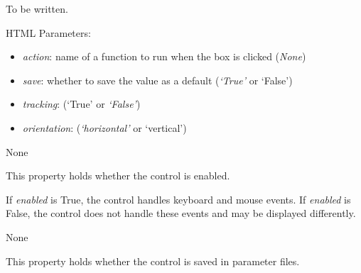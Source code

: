 \documentclass[letterpaper,10pt,english]{sphinxmanual}
\begin{document}

\begin{fulllineitems}
\label{api:controls.ScrollBar}
To be written.

HTML Parameters:
\begin{itemize}
\item {} 
\emph{action}: name of a function to run when the box is clicked (\emph{None})

\item {} 
\emph{save}: whether to save the value as a default (\emph{`True'} or `False')

\item {} 
\emph{tracking}: (`True' or  \emph{`False'})

\item {} 
\emph{orientation}: (\emph{`horizontal'} or `vertical')

\end{itemize}

\begin{fulllineitems}
\label{api:controls.ScrollBar.action}
None

\end{fulllineitems}


\begin{fulllineitems}
\label{api:controls.ScrollBar.enabled}
This property holds whether the control is enabled.

If \emph{enabled} is True, the control handles keyboard and mouse events.
If \emph{enabled} is False, the control does not handle these events and may
be displayed differently.

\end{fulllineitems}


\begin{fulllineitems}
\label{api:controls.ScrollBar.ranges}
None

\end{fulllineitems}


\begin{fulllineitems}
\label{api:controls.ScrollBar.save}
This property holds whether the control is saved in parameter files.


\end{fulllineitems}
\end{fulllineitems}
\end{document}

